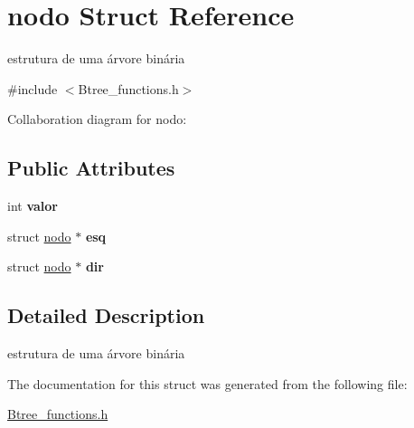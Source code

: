 \hypertarget{structnodo}{}\section{nodo Struct Reference}
\label{structnodo}


estrutura de uma árvore binária  




{\ttfamily \#include $<$Btree\+\_\+functions.\+h$>$}



Collaboration diagram for nodo\+:
\subsection*{Public Attributes}
\begin{DoxyCompactItemize}
\item 
\mbox{\label{structnodo_a40424c40ee6ffe6e5624f51ac42cbd20}} 
int {\bfseries valor}
\item 
\mbox{\label{structnodo_a8aa0bcd96889a01520b1624449fc07d0}} 
struct \hyperlink{structnodo}{nodo} $\ast$ {\bfseries esq}
\item 
\mbox{\label{structnodo_acb489ce2018caeddde0605244cffa200}} 
struct \hyperlink{structnodo}{nodo} $\ast$ {\bfseries dir}
\end{DoxyCompactItemize}


\subsection{Detailed Description}
estrutura de uma árvore binária 

The documentation for this struct was generated from the following file\+:\begin{DoxyCompactItemize}
\item 
\hyperlink{Btree__functions_8h}{Btree\+\_\+functions.\+h}\end{DoxyCompactItemize}
